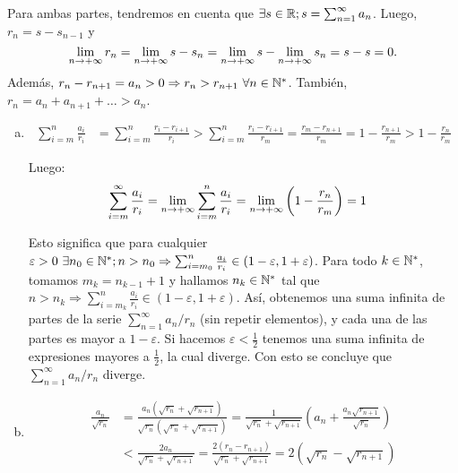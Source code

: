 
{
	\newcommand{\openci}[2]{\left(#1-#2,#1+#2\right)}
	Para ambas partes, tendremos en cuenta que $\exists s\in\mathbb{R}; s=\sum_{n=1}^{\infty}{a_n}$. Luego, $r_n = s - s_{n-1}$ y
	$$
		\limite{n}{r_n} = \limite{n}{s-s_n} = \limite{n}{s} - \limite{n}{s_n} = s-s = 0
	.$$
	Además, $r_n-r_{n+1} = a_n > 0 \Rightarrow r_n > r_{n+1}\ \forall n\in\mathbb{N}^*$. También, $r_n = a_n + a_{n+1} + \ldots > a_n$.

	\begin{enumerate}[a)]

		\item
			\begin{align*}
				\sum_{i=m}^{n}{\frac{a_i}{r_i}}
				&= \sum_{i=m}^{n}{\frac{r_i-r_{i+1}}{r_i}}
				> \sum_{i=m}^{n}{\frac{r_i-r_{i+1}}{r_m}}
				= \frac{r_m-r_{n+1}}{r_m}
				= 1 - \frac{r_{n+1}}{r_m}
				> 1 - \frac{r_n}{r_m}
			\end{align*}

			Luego:
			\begin{align*}
				\sum_{i=m}^{\infty}{\frac{a_i}{r_i}}
				&= \limite{n}{\sum_{i=m}^{n}{\frac{a_i}{r_i}}}
				= \limite{n}{\left(1-\frac{r_n}{r_m}\right)}
				= 1
			\end{align*}

			Esto significa que para cualquier $\varepsilon > 0\ \exists n_0\in\N; n>n_0 \Rightarrow \sum_{i=m_0}^{n}{\frac{a_i}{r_i}} \in\openci{1}{\varepsilon}$.
			Para todo $k\in\mathbb{N}^*$, tomamos $m_k = n_{k-1} + 1$ y hallamos $n_k\in\mathbb{N}^*$ tal que $n>n_k \Rightarrow \sum_{i=m_k}^{n}{\frac{a_i}{r_i}} \in\openci{1}{\varepsilon}$.
			Así, obtenemos una suma infinita de partes de la serie $\sum_{n=1}^{\infty}{a_n/r_n}$ (sin repetir elementos), y cada una de las partes es mayor a $1-\varepsilon$. Si hacemos $\varepsilon<\frac{1}{2}$ tenemos una suma infinita de expresiones mayores a $\frac{1}{2}$, la cual diverge.
			Con esto se concluye que $\sum_{n=1}^{\infty}{a_n/r_n}$ diverge.

		\item
			\begin{align*}
				\frac{a_n}{\sqrt{r_n}}
				&= \frac{a_n(\sqrt{r_n}+\sqrt{r_{n+1}})}{\sqrt{r_n}(\sqrt{r_n}+\sqrt{r_{n+1}})}
				= \frac{1}{\sqrt{r_n}+\sqrt{r_{n+1}}}\left( a_n + \frac{a_n\sqrt{r_{n+1}}}{\sqrt{r_n}} \right)
				\\
				&< \frac{2a_n}{\sqrt{r_n}+\sqrt{r_{n+1}}}
				= \frac{2(r_n-r_{n+1})}{\sqrt{r_n}+\sqrt{r_{n+1}}}
				= 2(\sqrt{r_n}-\sqrt{r_{n+1}})
			\end{align*}


\end{enumerate}}
